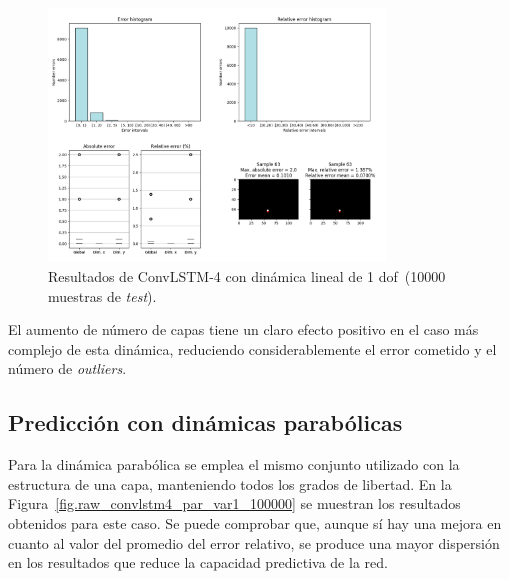 \begin{figure}[H]
		\begin{center}
			\includegraphics[width=0.8\textwidth]{ figures/test_raw/REC/ConvLSTM_complex/lin_var_100000.png}
			\caption{Resultados de ConvLSTM-4 con dinámica lineal de 1 \acrshort{dof}~(10000 muestras de \textit{test}).}
			\label{fig.raw_convlstm4_lin_var_100000}
		\end{center}
\end{figure}
\vspace{-10pt}

El aumento de número de capas tiene un claro efecto positivo en el caso más complejo de esta dinámica, reduciendo  considerablemente el error cometido y el número de \textit{outliers}.

\subsection{Predicción con dinámicas parabólicas}
Para la dinámica parabólica se emplea el mismo conjunto utilizado con la estructura de una capa, manteniendo todos los grados de libertad. En la Figura~\ref{fig.raw_convlstm4_par_var1_100000} se muestran los resultados obtenidos para este caso. Se puede comprobar que, aunque sí  hay una mejora en cuanto al valor del promedio del error relativo, se produce una mayor dispersión en los resultados que reduce la capacidad predictiva de la red.

